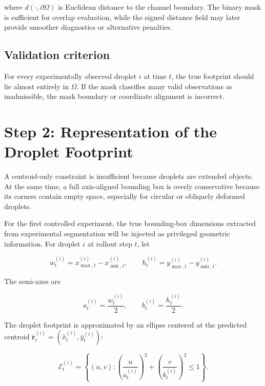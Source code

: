 \documentclass[11pt]{article}
\begin{document}
where $d(\cdot,\partial\Omega)$ is Euclidean distance to the channel boundary. The binary mask is sufficient for overlap evaluation, while the signed distance field may later provide smoother diagnostics or alternative penalties.

\subsection*{Validation criterion}

For every experimentally observed droplet $i$ at time $t$, the true footprint should lie almost entirely in $\Omega$. If the mask classifies many valid observations as inadmissible, the mask boundary or coordinate alignment is incorrect.

\section{Step 2: Representation of the Droplet Footprint}

A centroid-only constraint is insufficient because droplets are extended objects. At the same time, a full axis-aligned bounding box is overly conservative because its corners contain empty space, especially for circular or obliquely deformed droplets.

For the first controlled experiment, the true bounding-box dimensions extracted from experimental segmentation will be injected as privileged geometric information. For droplet $i$ at rollout step $t$, let

\begin{equation}
    w_{t}^{(i)}
    =
    x_{\max,t}^{(i)}-x_{\min,t}^{(i)},
    \qquad
    h_{t}^{(i)}
    =
    y_{\max,t}^{(i)}-y_{\min,t}^{(i)}.
\end{equation}

The semi-axes are

\begin{equation}
    a_{t}^{(i)}=\frac{w_{t}^{(i)}}{2},
    \qquad
    b_{t}^{(i)}=\frac{h_{t}^{(i)}}{2}.
\end{equation}

The droplet footprint is approximated by an ellipse centered at the predicted centroid
$\hat{\bm{r}}_{t}^{(i)}=
(\hat{x}_{t}^{(i)},\hat{y}_{t}^{(i)})$:

\begin{equation}
    \mathcal{E}_{t}^{(i)}
    =
    \left\{
    (u,v):
    \left(\frac{u}{a_{t}^{(i)}}\right)^{2}
    +
    \left(\frac{v}{b_{t}^{(i)}}\right)^{2}
    \leq 1
    \right\}.
\end{equation}
\end{document}
